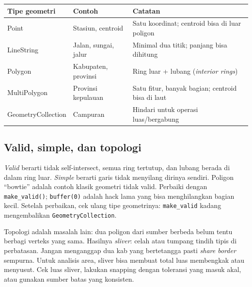 \documentclass[9pt,a4paper]{extarticle}
\newcommand{\code}[1]{\texttt{\small\color{ink}#1}}
\newcommand{\term}[1]{\textit{#1}}
\newcommand{\thead}[1]{\textbf{\color{ink}#1}}
\begin{document}
\begin{center}
\footnotesize
\begin{tabularx}{\linewidth}{@{}>{\RaggedRight\arraybackslash}p{2.7cm}>{\RaggedRight\arraybackslash}p{4.2cm}>{\RaggedRight\arraybackslash}X@{}}
\toprule
\rowcolor{bg}\thead{Tipe geometri} & \thead{Contoh} & \thead{Catatan}\\
\midrule
Point & Stasiun, centroid & Satu koordinat; centroid bisa di luar poligon\\
LineString & Jalan, sungai, jalur & Minimal dua titik; panjang bisa dihitung\\
Polygon & Kabupaten, provinsi & Ring luar + lubang (\emph{interior rings})\\
MultiPolygon & Provinsi kepulauan & Satu fitur, banyak bagian; centroid bisa di laut\\
GeometryCollection & Campuran & Hindari untuk operasi luas/bergabung\\
\bottomrule
\end{tabularx}
\end{center}

\subsection{Valid, simple, dan topologi}

\term{Valid} berarti tidak self-intersect, semua ring tertutup, dan lubang berada di dalam ring luar. \term{Simple} berarti garis tidak menyilang dirinya sendiri. Poligon ``bowtie'' adalah contoh klasik geometri tidak valid. Perbaiki dengan \code{make\_valid()}; \code{buffer(0)} adalah hack lama yang bisa menghilangkan bagian kecil. Setelah perbaikan, cek ulang tipe geometrinya: \code{make\_valid} kadang mengembalikan \code{GeometryCollection}.

Topologi adalah masalah lain: dua poligon dari sumber berbeda belum tentu berbagi verteks yang sama. Hasilnya \term{sliver}: celah atau tumpang tindih tipis di perbatasan. Jangan menganggap dua kab yang bertetangga pasti \emph{share border} sempurna. Untuk analisis area, sliver bisa membuat total luas membengkak atau menyusut. Cek luas sliver, lakukan snapping dengan toleransi yang masuk akal, atau gunakan sumber batas yang konsisten.
\end{document}
